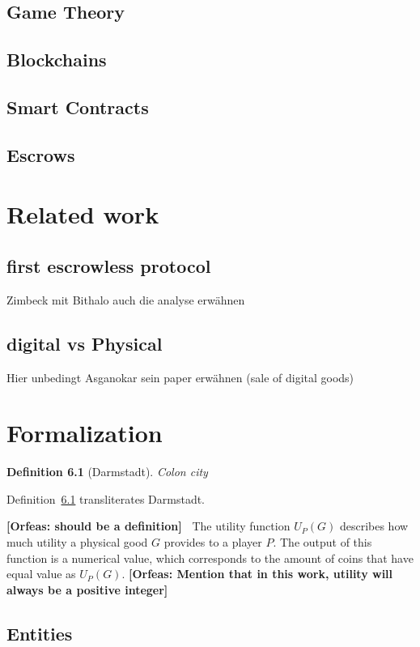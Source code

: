 \documentclass{cacthesis}
\newcommand{\authnote}[3]{{ \footnotesize \textbf{#1[#2: #3]~}}}
\newcommand{\orfnote}[1]{\authnote{\color{blue}}{Orfeas}{#1}}
\newtheorem{definition}{Definition}
\begin{document}
\section{Game Theory}
\section{Blockchains}
\section{Smart Contracts}
\section{Escrows}

\chapter{Related work}
\section{first escrowless protocol}
Zimbeck mit Bithalo
auch die analyse erwähnen
\section{digital vs Physical}
Hier unbedingt Asganokar sein paper erwähnen (sale of digital goods)

\chapter{Formalization}

\begin{definition}[Darmstadt]
\label{def:darmstadt}
Colon city
\end{definition}
Definition~\ref{def:darmstadt} transliterates Darmstadt.

\orfnote{should be a definition}
The utility function $U_P(G)$ describes how much utility a physical good $G$ provides to a player $P$. The output of this function is a numerical value, which corresponds to the amount of coins that have equal value as $U_P(G)$.
\orfnote{Mention that in this work, utility will always be a positive integer}
\section{Entities}
\end{document}
